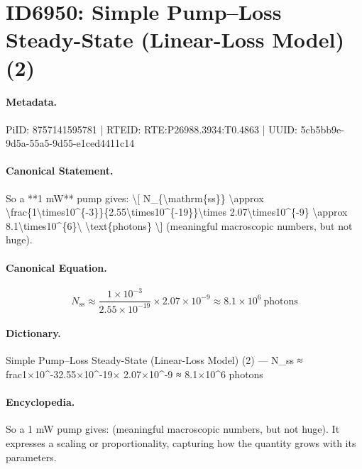 \section*{ID6950: Simple Pump–Loss Steady-State (Linear-Loss Model) (2)}
\paragraph{Metadata.}
PiID: 8757141595781 | RTEID: RTE:P26988.3934:T0.4863 | UUID: 5cb5bb9e-9d5a-55a5-9d55-e1ced4411c14

\paragraph{Canonical Statement.}
So a **1 mW** pump gives: \textbackslash{}[ N\_\{\textbackslash{}mathrm\{ss\}\} \textbackslash{}approx \textbackslash{}frac\{1\textbackslash{}times10\textasciicircum{}\{-3\}\}\{2.55\textbackslash{}times10\textasciicircum{}\{-19\}\}\textbackslash{}times 2.07\textbackslash{}times10\textasciicircum{}\{-9\} \textbackslash{}approx 8.1\textbackslash{}times10\textasciicircum{}\{6\}\textbackslash{} \textbackslash{}text\{photons\} \textbackslash{}] (meaningful macroscopic numbers, but not huge).

\paragraph{Canonical Equation.}
\[
N_{\mathrm{ss}} \approx \frac{1\times10^{-3}}{2.55\times10^{-19}}\times 2.07\times10^{-9} \approx 8.1\times10^{6}\ \text{photons}
\]

\paragraph{Dictionary.}
Simple Pump–Loss Steady-State (Linear-Loss Model) (2) — N\_ss ≈ frac1×10\textasciicircum{}-32.55×10\textasciicircum{}-19× 2.07×10\textasciicircum{}-9 ≈ 8.1×10\textasciicircum{}6 photons

\paragraph{Encyclopedia.}
So a 1 mW pump gives: (meaningful macroscopic numbers, but not huge). It expresses a scaling or proportionality, capturing how the quantity grows with its parameters.
